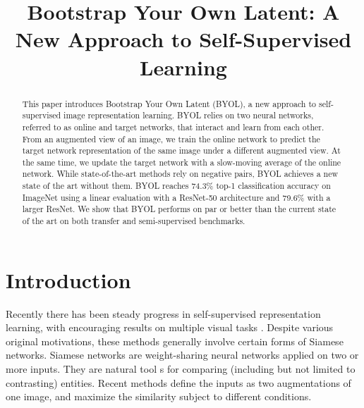 \documentclass[conference]{IEEEtran}
\begin{document}
\title{Bootstrap Your Own Latent: A New Approach to Self-Supervised Learning}

\author{
}

\maketitle

\begin{abstract}
This paper introduces Bootstrap Your Own Latent (BYOL), a new approach to self-supervised image representation learning. BYOL relies on two neural networks, referred to as online and target networks, that interact and learn from each other.
From an augmented view of an image, we train the online network to predict the target network representation of the same image under a different augmented view. 
At the same time, we update the target network with a slow-moving average of the online network. While state-of-the-art methods rely on negative pairs, BYOL achieves a new state of the art without them.
BYOL reaches 74.3\% top-1 classification accuracy on ImageNet using a linear evaluation with a ResNet-50 architecture and 79.6\% with a larger ResNet. 
We show that BYOL performs on par or better than the current state of the art on both transfer and semi-supervised benchmarks. 
\end{abstract}


\section{Introduction}
Recently there has been steady progress in self-supervised representation learning, with encouraging results on multiple visual tasks \cite{b1}.
Despite various original motivations, these methods generally involve certain forms of Siamese networks. Siamese networks are weight-sharing neural networks applied on two or more inputs.
They are natural tool s for comparing (including but not limited to contrasting) entities. Recent methods define the inputs as two augmentations of one image, and maximize the similarity subject to different conditions.
\end{document}
